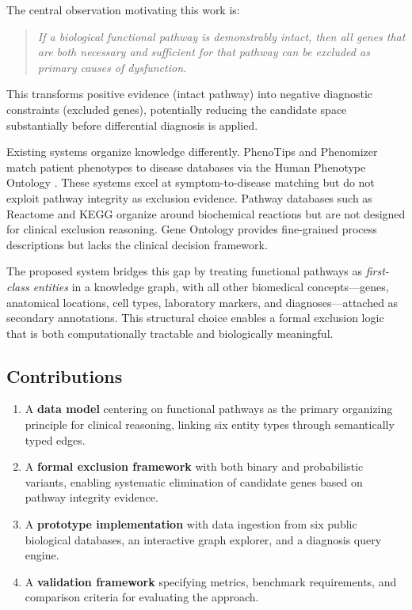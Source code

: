 \documentclass[12pt,a4paper]{article}
\begin{document}
The central observation motivating this work is:

\begin{quote}
\emph{If a biological functional pathway is demonstrably intact, then all genes that are both necessary and sufficient for that pathway can be excluded as primary causes of dysfunction.}
\end{quote}

This transforms positive evidence (intact pathway) into negative diagnostic constraints (excluded genes), potentially reducing the candidate space substantially before differential diagnosis is applied.

Existing systems organize knowledge differently. PhenoTips \citep{Girdea2013} and Phenomizer \citep{Kohler2009} match patient phenotypes to disease databases via the Human Phenotype Ontology \citep{Robinson2008}. These systems excel at symptom-to-disease matching but do not exploit pathway integrity as exclusion evidence. Pathway databases such as Reactome \citep{Fabregat2018} and KEGG organize around biochemical reactions but are not designed for clinical exclusion reasoning. Gene Ontology \citep{Ashburner2000} provides fine-grained process descriptions but lacks the clinical decision framework.

The proposed system bridges this gap by treating functional pathways as \emph{first-class entities} in a knowledge graph, with all other biomedical concepts---genes, anatomical locations, cell types, laboratory markers, and diagnoses---attached as secondary annotations. This structural choice enables a formal exclusion logic that is both computationally tractable and biologically meaningful.

\subsection{Contributions}

\begin{enumerate}
    \item A \textbf{data model} centering on functional pathways as the primary organizing principle for clinical reasoning, linking six entity types through semantically typed edges.
    \item A \textbf{formal exclusion framework} with both binary and probabilistic variants, enabling systematic elimination of candidate genes based on pathway integrity evidence.
    \item A \textbf{prototype implementation} with data ingestion from six public biological databases, an interactive graph explorer, and a diagnosis query engine.
    \item A \textbf{validation framework} specifying metrics, benchmark requirements, and comparison criteria for evaluating the approach.
\end{enumerate}
\end{document}
